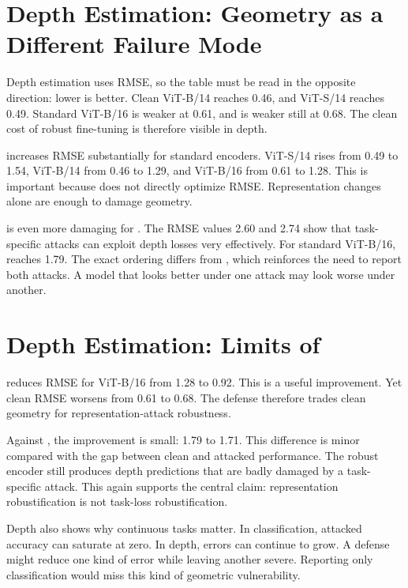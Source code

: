 \section{Depth Estimation: Geometry as a Different Failure Mode}

Depth estimation uses RMSE, so the table must be read in the opposite direction: lower is better. Clean \DINOv ViT-B/14 reaches 0.46, and \DINOv ViT-S/14 reaches 0.49. Standard \DINO ViT-B/16 is weaker at 0.61, and \DeACL is weaker still at 0.68. The clean cost of robust fine-tuning is therefore visible in depth.

\EmbedAttack increases RMSE substantially for standard encoders. \DINOv ViT-S/14 rises from 0.49 to 1.54, \DINOv ViT-B/14 from 0.46 to 1.29, and \DINO ViT-B/16 from 0.61 to 1.28. This is important because \EmbedAttack does not directly optimize RMSE. Representation changes alone are enough to damage geometry.

\DepthPGD is even more damaging for \DINOv. The RMSE values 2.60 and 2.74 show that task-specific attacks can exploit depth losses very effectively. For standard \DINO ViT-B/16, \DepthPGD reaches 1.79. The exact ordering differs from \EmbedAttack, which reinforces the need to report both attacks. A model that looks better under one attack may look worse under another.

\section{Depth Estimation: Limits of \DeACL}

\DeACL reduces \EmbedAttack RMSE for \DINO ViT-B/16 from 1.28 to 0.92. This is a useful improvement. Yet clean RMSE worsens from 0.61 to 0.68. The defense therefore trades clean geometry for representation-attack robustness.

Against \DepthPGD, the improvement is small: 1.79 to 1.71. This difference is minor compared with the gap between clean and attacked performance. The robust encoder still produces depth predictions that are badly damaged by a task-specific attack. This again supports the central claim: representation robustification is not task-loss robustification.

Depth also shows why continuous tasks matter. In classification, attacked accuracy can saturate at zero. In depth, errors can continue to grow. A defense might reduce one kind of error while leaving another severe. Reporting only classification would miss this kind of geometric vulnerability.

